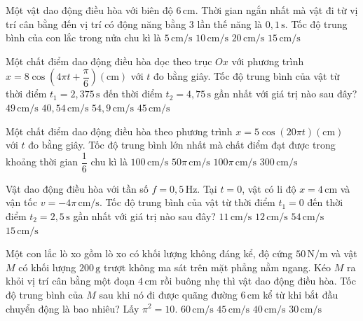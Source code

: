 \begin{ex}
Một vật dao động điều hòa với biên độ $6\,\mathrm{cm}$. Thời gian ngắn nhất mà vật đi từ vị trí cân bằng đến vị trí có động năng bằng $3$ lần thế năng là $0,1\,\mathrm{s}$. Tốc độ trung bình của con lắc trong nửa chu kì là
\choice
{$5\,\mathrm{cm/s}$}
{$10\,\mathrm{cm/s}$}
{\True $20\,\mathrm{cm/s}$}
{$15\,\mathrm{cm/s}$}
\end{ex}

\begin{ex}
Một chất điểm dao động điều hòa dọc theo trục $Ox$ với phương trình
$x=8\cos\left(4\pi t+\dfrac{\pi}{6}\right) (\mathrm{cm})$
với $t$ đo bằng giây. Tốc độ trung bình của vật từ thời điểm $t_1=2,375\,\mathrm{s}$ đến thời điểm $t_2=4,75\,\mathrm{s}$ gần nhất với giá trị nào sau đây?
\choice
{\True $49\,\mathrm{cm/s}$}
{$40,54\,\mathrm{cm/s}$}
{$54,9\,\mathrm{cm/s}$}
{$45\,\mathrm{cm/s}$}
\end{ex}

\begin{ex}
Một chất điểm dao động điều hòa theo phương trình
$x=5\cos(20\pi t) (\mathrm{cm})$
với $t$ đo bằng giây. Tốc độ trung bình lớn nhất mà chất điểm đạt được trong khoảng thời gian $\dfrac{1}{6}$ chu kì là
\choice
{$100\,\mathrm{cm/s}$}
{$50\pi\,\mathrm{cm/s}$}
{$100\pi\,\mathrm{cm/s}$}
{\True $300\,\mathrm{cm/s}$}
\end{ex}

\begin{ex}
Vật dao động điều hòa với tần số $f=0,5\,\mathrm{Hz}$. Tại $t=0$, vật có li độ $x=4\,\mathrm{cm}$ và vận tốc $v=-4\pi\,\mathrm{cm/s}$. Tốc độ trung bình của vật từ thời điểm $t_1=0$ đến thời điểm $t_2=2,5\,\mathrm{s}$ gần nhất với giá trị nào sau đây?
\choice
{$11\,\mathrm{cm/s}$}
{\True $12\,\mathrm{cm/s}$}
{$54\,\mathrm{cm/s}$}
{$15\,\mathrm{cm/s}$}
\end{ex}

\begin{ex}
Một con lắc lò xo gồm lò xo có khối lượng không đáng kể, độ cứng $50\,\mathrm{N/m}$ và vật $M$ có khối lượng $200\,\mathrm{g}$ trượt không ma sát trên mặt phẳng nằm ngang. Kéo $M$ ra khỏi vị trí cân bằng một đoạn $4\,\mathrm{cm}$ rồi buông nhẹ thì vật dao động điều hòa. Tốc độ trung bình của $M$ sau khi nó đi được quãng đường $6\,\mathrm{cm}$ kể từ khi bắt đầu chuyển động là bao nhiêu? Lấy $\pi^2=10$.
\choice
{$60\,\mathrm{cm/s}$}
{\True $45\,\mathrm{cm/s}$}
{$40\,\mathrm{cm/s}$}
{$30\,\mathrm{cm/s}$}
\end{ex}

